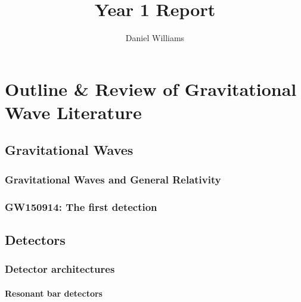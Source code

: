\documentclass{kentigern}
\title{Year 1 Report}
\author{Daniel Williams}
\begin{document}
\maketitle

\newpage
%

\tableofcontents

\part{Outline \& Review of Gravitational Wave Literature}
\label{part:introduction}



\chapter{Gravitational Waves}
\label{cha:grav-waves}




\section{Gravitational Waves and General Relativity}
\label{sec:grav-waves-gener}


\section{GW150914: The first detection}
\label{sec:gw150914:-first-dete}



\chapter{Detectors}
\label{cha:detectors}




\section{Detector architectures}
\label{sec:detect-arch}

\subsection{Resonant bar detectors}
\label{sec:reson-bar-detect}
\end{document}
